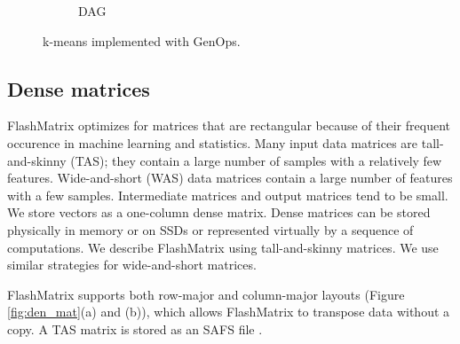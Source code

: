 \begin{figure}
\begin{subfigure}{.25\textwidth}
	\label{fig:dag}
	\caption{DAG}
	\end{subfigure}
  \vspace{-12pt}
	\caption{k-means implemented with GenOps.}
	\label{fig:kmeans}
  \vspace{-8pt}
\end{figure}

\vspace{-8pt}
\subsection{Dense matrices}
\vspace{-4pt}
FlashMatrix optimizes for matrices that are rectangular because
of their frequent occurence in machine learning and statistics.
Many input data matrices are tall-and-skinny (TAS); they contain
a large number of samples with a relatively few features.
Wide-and-short (WAS) data matrices contain a large number of features with
a few samples. Intermediate matrices and output matrices tend to be small.
We store vectors as a one-column dense matrix.
Dense matrices can be stored physically in memory or on SSDs or represented
virtually by a sequence of computations.
We describe FlashMatrix using tall-and-skinny matrices.  We use similar strategies for wide-and-short matrices.



FlashMatrix supports both row-major and column-major
layouts (Figure \ref{fig:den_mat}(a) and (b)), which allows 
FlashMatrix to transpose data without a copy.
A TAS matrix is stored as an SAFS file \cite{safs}.

